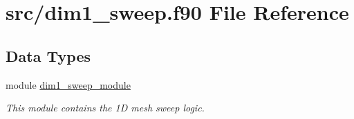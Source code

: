 \hypertarget{dim1__sweep_8f90}{\section{src/dim1\-\_\-sweep.f90 File Reference}
\label{dim1__sweep_8f90}
}
\subsection*{Data Types}
\begin{DoxyCompactItemize}
\item 
module \hyperlink{classdim1__sweep__module}{dim1\-\_\-sweep\-\_\-module}
\begin{DoxyCompactList}\small\item\em This module contains the 1\-D mesh sweep logic. \end{DoxyCompactList}\end{DoxyCompactItemize}
